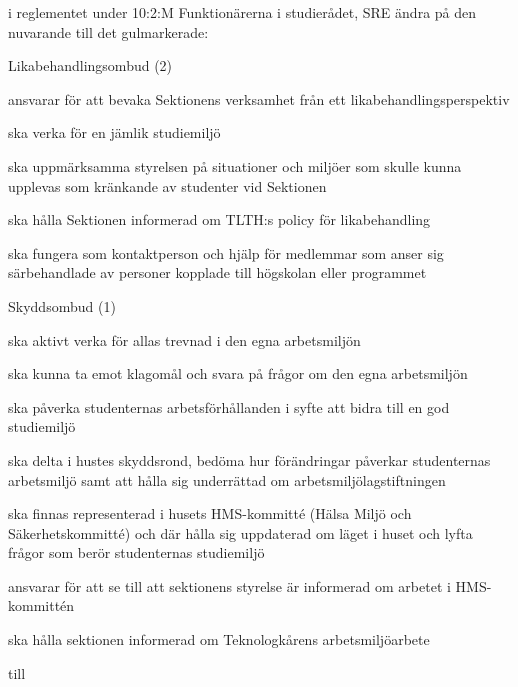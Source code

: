 \documentclass[../_main/handlingar.tex]{subfiles}
\begin{document}
\begin{attsatser}
  \att i reglementet under 10:2:M Funktionärerna i studierådet, SRE ändra på den
  nuvarande till det gulmarkerade:

  Likabehandlingsombud (2)
  \begin{dashlist}
      \item ansvarar för att bevaka Sektionens verksamhet från ett likabehandlingsperspektiv
      \item ska verka för en jämlik studiemiljö
      \item ska uppmärksamma styrelsen på situationer och miljöer som skulle kunna upplevas som kränkande av studenter vid Sektionen
      \item ska hålla Sektionen informerad om TLTH:s policy för likabehandling
      \item ska fungera som kontaktperson och hjälp för medlemmar som anser sig särbehandlade av personer kopplade till högskolan eller programmet
  \end{dashlist}
  Skyddsombud (1)
      \begin{dashlist}
          \item ska aktivt verka för allas trevnad i den egna arbetsmiljön
          \item ska kunna ta emot klagomål och svara på frågor om den egna arbetsmiljön
          \item ska påverka studenternas arbetsförhållanden i syfte att bidra till en god studiemiljö
          \item ska delta i hustes skyddsrond, bedöma hur förändringar påverkar studenternas arbetsmiljö samt att
hålla sig underrättad om arbetsmiljölagstiftningen
    \item ska finnas representerad i husets HMS-kommitté (Hälsa Miljö och Säkerhetskommitté) och där hålla
sig uppdaterad om läget i huset och lyfta frågor som berör studenternas studiemiljö
    \item ansvarar för att se till att sektionens styrelse är informerad om arbetet i HMS-kommittén
    \item ska hålla sektionen informerad om Teknologkårens arbetsmiljöarbete
      \end{dashlist}

      till


\end{attsatser}
\end{document}
